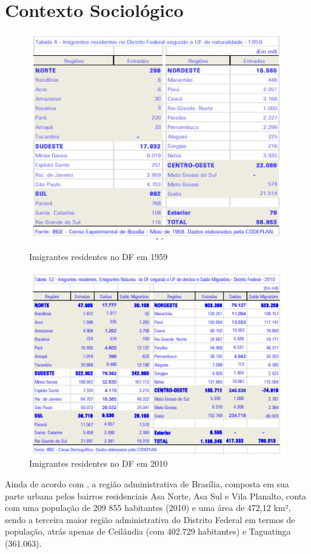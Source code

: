 \section{Contexto Sociológico}

\begin{figure}[h!]
    \centering
    \includegraphics{fig/imigrantes-1959}
    \label{table:imigrantes-1959}
    \caption{Imigrantes residentes no DF em 1959}
\end{figure}

\begin{figure}[h!]
    \centering
    \includegraphics{fig/imigrantes-2010}
    \caption{Imigrantes residentes no DF em 2010}
    \label{table:imigrantes-2010}
\end{figure}


Ainda de acordo com , a região administrativa de Brasília, composta em sua parte urbana pelos bairros residenciais Asa Norte, Asa Sul e Vila Planalto, conta com uma população de 209 855 habitantes (2010) e uma área de 472,12 km², sendo a terceira maior região administrativa do Distrito Federal em termos de população, atrás apenas de Ceilândia (com 402.729 habitantes) e Taguatinga (361.063).\\

